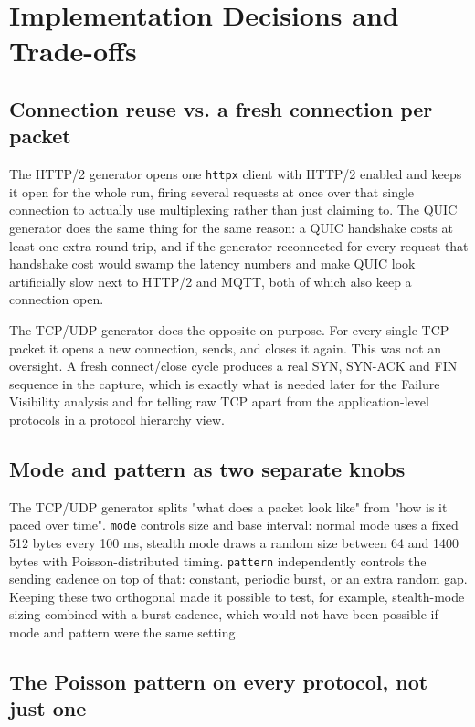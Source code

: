 \section{Implementation Decisions and Trade-offs}

\subsection{Connection reuse vs. a fresh connection per packet}

The HTTP/2 generator opens one \texttt{httpx} client with HTTP/2 enabled and
keeps it open for the whole run, firing several requests at once over that
single connection to actually use multiplexing rather than just claiming to.
The QUIC generator does the same thing for the same reason: a QUIC handshake
costs at least one extra round trip, and if the generator reconnected for
every request that handshake cost would swamp the latency numbers and make
QUIC look artificially slow next to HTTP/2 and MQTT, both of which also keep a
connection open.

The TCP/UDP generator does the opposite on purpose. For every single TCP
packet it opens a new connection, sends, and closes it again. This was not an
oversight. A fresh connect/close cycle produces a real SYN, SYN-ACK and FIN
sequence in the capture, which is exactly what is needed later for the
Failure Visibility analysis and for telling raw TCP apart from the
application-level protocols in a protocol hierarchy view.

\subsection{Mode and pattern as two separate knobs}

The TCP/UDP generator splits "what does a packet look like" from "how is it
paced over time". \texttt{mode} controls size and base interval: normal mode
uses a fixed 512 bytes every 100 ms, stealth mode draws a random size between
64 and 1400 bytes with Poisson-distributed timing. \texttt{pattern}
independently controls the sending cadence on top of that: constant, periodic
burst, or an extra random gap. Keeping these two orthogonal made it possible
to test, for example, stealth-mode sizing combined with a burst cadence, which
would not have been possible if mode and pattern were the same setting.

\subsection{The Poisson pattern on every protocol, not just one}

